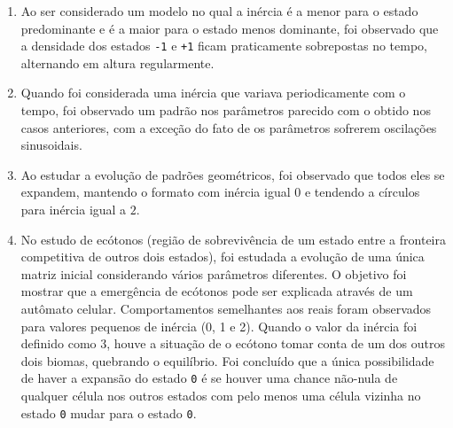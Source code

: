 \documentclass[12pt,a4paper,final]{article}
\begin{document}
\begin{enumerate}
    \item Ao ser considerado um modelo no qual a inércia é a menor para o estado predominante e é a maior para o estado menos dominante, foi observado que a densidade dos estados \texttt{-1} e \texttt{+1} ficam praticamente sobrepostas no tempo, alternando em altura regularmente.
    \item Quando foi considerada uma inércia que variava periodicamente com o tempo, foi observado um padrão nos parâmetros parecido com o obtido nos casos anteriores, com a exceção do fato de os parâmetros sofrerem oscilações sinusoidais.
    \item Ao estudar a evolução de padrões geométricos, foi observado que todos eles se expandem, mantendo o formato com inércia igual $0$ e tendendo a círculos para inércia igual a $2$.
    \item No estudo de ecótonos (região de sobrevivência de um estado entre a fronteira competitiva de outros dois estados), foi estudada a evolução de uma única matriz inicial considerando vários parâmetros diferentes. O objetivo foi mostrar que a emergência de ecótonos pode ser explicada através de um autômato celular. Comportamentos semelhantes aos reais foram observados para valores pequenos de inércia (0, 1 e 2). Quando o valor da inércia foi definido como $3$, houve a situação de o ecótono tomar conta de um dos outros dois biomas, quebrando o equilíbrio. Foi concluído que a única possibilidade de haver a expansão do estado \texttt{0} é se houver uma chance não-nula de qualquer célula nos outros estados com pelo menos uma célula vizinha no estado \texttt{0} mudar para o estado \texttt{0}.
  \end{enumerate}
  
\end{document}
